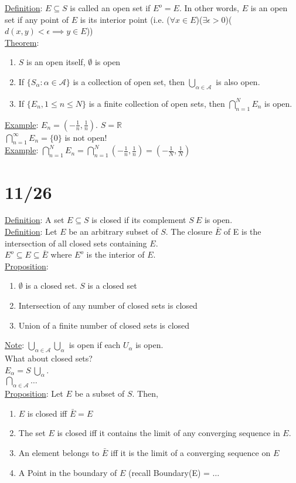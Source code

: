 \documentclass[11pt]{article}
\begin{document}
	\underline{Definition}: $E \subseteq S$ is called an open set if $E^o = 
		E$. In other words, $E$ is an open set if any point of $E$ is its 
		interior point (i.e. ($\forall x \in E$)($\exists \epsilon > 0$)($d(x,y)
		< \epsilon \implies y \in E$))\\
	\underline{Theorem}: 
	\begin{enumerate}
		\item $S$ is an open itself, $\emptyset$ is open
		\item If $\{ S_{\alpha}: \alpha \in \mathcal{A}\}$ is a collection of
			open set, then $\bigcup_{\alpha \in \mathcal{A}}$ is also open.
		\item If $\{ E_n, 1 \le n \le N \}$ is a finite collection of open sets,
			then $\bigcap_{n = 1}^N E_n$ is open.
	\end{enumerate}
	\underline{Example}: $E_n = (-\frac{1}{n}, \frac{1}{n})$. $S = 
		\mathbb{R}$\\
		$\bigcap_{n=1}^{\infty} E_n = \{ 0 \}$ is not open!\\
	\underline{Example}: $\bigcap_{n = 1}^N E_n = \bigcap_{n = 1}^{N} 
	(-\frac{1}{n}, \frac{1}{n}) = (-\frac{1}{N}, \frac{1}{N})$

\section*{11/26}
	\underline{Definition}: A set $E \subseteq S$ is closed if its complement
	$S \ E$ is open.\\
	\underline{Definition}: Let $E$ be an arbitrary subset of $S$. The closure
	$\bar{E}$ of E is the intersection of all closed sets containing $E$.\\
	$E^o \subseteq E \subseteq \bar{E}$ where $E^o$ is the interior of $E$.\\
	\underline{Proposition}:
	\begin{enumerate}
		\item $\emptyset$ is a closed set. $S$ is a closed set
		\item Intersection of any number of closed sets is closed
		\item Union of a finite number of closed sets is closed
	\end{enumerate}
	\underline{Note}: $\bigcup_{\alpha \in \mathcal{A}} \bigcup_{\alpha}$ is 
	open if each $U_{\alpha}$ is open.\\
	What about closed sets?\\
	$E_{\alpha} = S \ \bigcup_{\alpha}$.\\
	$\bigcap_{\alpha \in \mathcal{A}} \ldots$\\
	\underline{Proposition}: Let $E$ be a subset of $S$. Then,
	\begin{enumerate}
		\item $E$ is closed iff $\bar{E} = E$
		\item The set $E$ is closed iff it contains the limit of any converging
		sequence in $E$.\\
		\item An element belongs to $\bar{E}$ iff it is the limit of a converging 
		sequence on $E$\\
		\item A Point in the boundary of $E$ (recall Boundary(E) = $\ldots$
	\end{enumerate}
\end{document}
